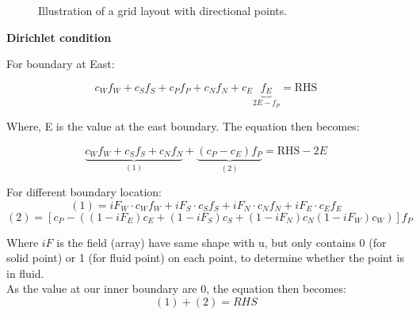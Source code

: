 \documentclass[12pt]{article}
\begin{document}
\begin{figure}[H]
\centering
{}
\caption{Illustration of a grid layout with directional points.}
\end{figure}




\noindent \textbf{Dirichlet condition} 

\noindent For boundary at East:

\[
c_W f_W + c_S f_S + c_P f_P + c_N f_N + c_E\underbrace{ f_E}_{2E-f_P} = \text{RHS}
\]




Where, E is the value at the east boundary. The equation then becomes:

\[
\underbrace{c_W f_W + c_S f_S+ c_N f_N}_{(1)}  + \underbrace{(c_P - c_E) f_P }_{(2)}
= 
\text{RHS} - 2E
\]

\noindent For different boundary location:
$$
(1) = iF_W \cdot c_W f_W + iF_S \cdot c_S f_S + iF_N \cdot c_N f_N + iF_E \cdot c_E f_E
$$
$$
(2) = \left[ c_P - ((1-iF_E) c_E + (1-iF_S) c_S + (1-iF_N) c_N (1-iF_W) c_W) \right] f_P
$$

Where $iF$ is the field (array) have same shape with u, but only contains 0 (for solid point) or 1 (for fluid point) on each point, to determine whether the point is in fluid.\\


\noindent As the value at our inner boundary are 0,
the equation then becomes:
$$
(1) + (2) = RHS
$$
\end{document}

